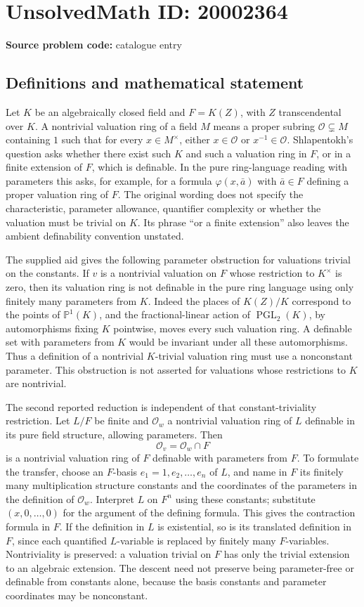 \documentclass[11pt]{article}
\newcommand{\PP}{\mathbb{P}}
\begin{document}
\section*{UnsolvedMath ID: 20002364}
\textbf{Source problem code:} catalogue entry
\subsection{Definitions and mathematical statement}
Let $K$ be an algebraically closed field and $F=K(Z)$, with $Z$ transcendental over $K$. A nontrivial valuation ring of a field $M$ means a proper subring $\mathcal O\subsetneq M$ containing $1$ such that for every $x\in M^\times$, either $x\in\mathcal O$ or $x^{-1}\in\mathcal O$. Shlapentokh's question asks whether there exist such $K$ and such a valuation ring in $F$, or in a finite extension of $F$, which is definable. In the pure ring-language reading with parameters this asks, for example, for a formula $\varphi(x,\bar a)$ with $\bar a\in F$ defining a proper valuation ring of $F$. The original wording does not specify the characteristic, parameter allowance, quantifier complexity or whether the valuation must be trivial on $K$. Its phrase ``or a finite extension'' also leaves the ambient definability convention unstated.

The supplied aid gives the following parameter obstruction for valuations trivial on the constants. If $v$ is a nontrivial valuation on $F$ whose restriction to $K^\times$ is zero, then its valuation ring is not definable in the pure ring language using only finitely many parameters from $K$. Indeed the places of $K(Z)/K$ correspond to the points of $\PP^1(K)$, and the fractional-linear action of $\operatorname{PGL}_2(K)$, by automorphisms fixing $K$ pointwise, moves every such valuation ring. A definable set with parameters from $K$ would be invariant under all these automorphisms. Thus a definition of a nontrivial $K$-trivial valuation ring must use a nonconstant parameter. This obstruction is not asserted for valuations whose restrictions to $K$ are nontrivial.

The second reported reduction is independent of that constant-triviality restriction. Let $L/F$ be finite and $\mathcal O_w$ a nontrivial valuation ring of $L$ definable in its pure field structure, allowing parameters. Then
\[
 \mathcal O_v=\mathcal O_w\cap F
\]
is a nontrivial valuation ring of $F$ definable with parameters from $F$. To formulate the transfer, choose an $F$-basis $e_1=1,e_2,\ldots,e_n$ of $L$, and name in $F$ its finitely many multiplication structure constants and the coordinates of the parameters in the definition of $\mathcal O_w$. Interpret $L$ on $F^n$ using these constants; substitute $(x,0,\ldots,0)$ for the argument of the defining formula. This gives the contraction formula in $F$. If the definition in $L$ is existential, so is its translated definition in $F$, since each quantified $L$-variable is replaced by finitely many $F$-variables. Nontriviality is preserved: a valuation trivial on $F$ has only the trivial extension to an algebraic extension. The descent need not preserve being parameter-free or definable from constants alone, because the basis constants and parameter coordinates may be nonconstant.
\end{document}

